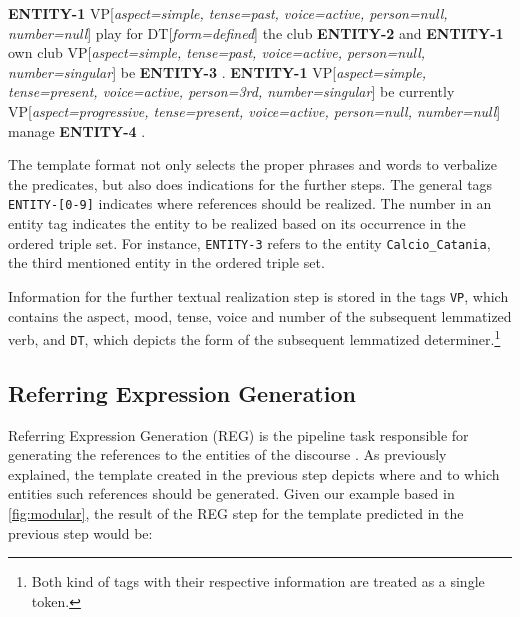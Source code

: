 \documentclass[11pt,a4paper]{article}
\begin{document}
\vspace{0.3cm}
\begin{displayquote}
    \footnotesize
    \vspace{0.1cm}
    \noindent \textbf{ENTITY-1} VP[\textit{aspect=simple, tense=past, voice=active, person=null, number=null}] play for DT[\textit{form=defined}] the club \textbf{ENTITY-2} and \textbf{ENTITY-1} own club VP[\textit{aspect=simple, tense=past, voice=active, person=null, number=singular}] be \textbf{ENTITY-3} . \textbf{ENTITY-1} VP[\textit{aspect=simple, tense=present, voice=active, person=3rd, number=singular}] be currently VP[\textit{aspect=progressive, tense=present, voice=active, person=null, number=null}] manage \textbf{ENTITY-4} .
    \vspace{0.1cm}
\end{displayquote}
\vspace{0.1cm}

The template format not only selects the proper phrases and words to verbalize the predicates, but also does indications for the further steps. The general tags \texttt{ENTITY-[0-9]} indicates where references should be realized. The number in an entity tag indicates the entity to be realized based on its occurrence in the ordered triple set. For instance, \texttt{ENTITY-3} refers to the entity \texttt{Calcio\_Catania}, the third mentioned entity in the ordered triple set.

Information for the further textual realization step is stored in the tags \texttt{VP}, which contains the aspect, mood, tense, voice and number of the subsequent lemmatized verb, and \texttt{DT}, which depicts the form of the subsequent lemmatized determiner.\footnote{Both kind of tags with their respective information are treated as a single token.}




\subsection{Referring Expression Generation}

Referring Expression Generation (REG) is the pipeline task responsible for generating the references to the entities of the discourse \cite{krahmer2012}. As previously explained, the template created in the previous step depicts where and to which entities such references should be generated. Given our example based in \autoref{fig:modular}, the result of the REG step for the template predicted in the previous step would be:
\end{document}
